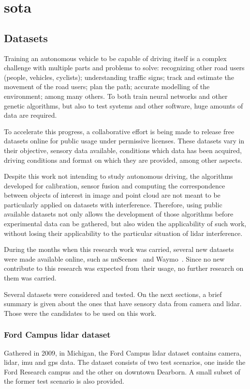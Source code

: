 \chapter{\acl{sota}}
\label{chapter:sota}

\section{Datasets}
\label{sec:sota:datasets}

Training an autonomous vehicle to be capable of driving itself is a complex challenge with multiple parts and problems to solve: recognizing other road users (people, vehicles, cyclists); understanding traffic signs; track and estimate the movement of the road users; plan the path; accurate modelling of the environment; among many others. To both train neural networks and other genetic algorithms, but also to test systems and other software, huge amounts of data are required.

To accelerate this progress, a collaborative effort is being made to release free datasets online for public usage under permissive licenses. These datasets vary in their objective, sensory data available, conditions which data has been acquired, driving conditions and format on which they are provided, among other aspects. 

Despite this work not intending to study autonomous driving, the algorithms developed for calibration, sensor fusion and computing the correspondence between objects of interest in image and point cloud are not meant to be particularly applied on datasets with interference. Therefore, using public available datasets not only allows the development of those algorithms before experimental data can be gathered, but also widen the applicability of such work, without losing their applicability to the particular situation of \ac{lidar} interference.

During the months when this research work was carried, several new datasets were made available online, such as nuScenes~\cite{nuScenes2019} and Waymo~\cite{Waymo}. Since no new contribute to this research was expected from their usage, no further research on them was carried. 

Several datasets were considered and tested. On the next sections, a brief summary is given about the ones that have sensory data from camera and \ac{lidar}. Those were the candidates to be used on this work.

\subsection{Ford Campus \acl{lidar} dataset}
Gathered in 2009, in Michigan, the Ford Campus \ac{lidar} dataset contains camera, \ac{lidar}, \ac{imu} and \ac{gps} data. The dataset consists of two test scenarios, one inside the Ford Research campus and the other on downtown Dearborn. A small subset of the former test scenario is also provided.

